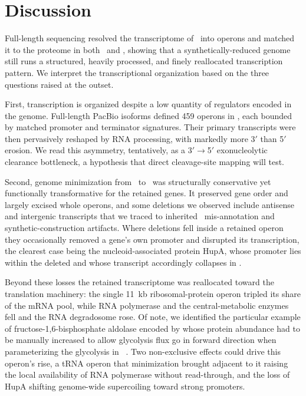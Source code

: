 \newpage

\section{Discussion}

Full-length sequencing resolved the transcriptome of \syn~into operons and matched it to the proteome in both \syn~and \syna, showing that a synthetically-reduced genome still runs a structured, heavily processed, and finely reallocated transcription pattern.
We interpret the transcriptional organization based on the three questions raised at the outset.

First, transcription is organized despite a low quantity of regulators encoded in the genome.
Full-length PacBio isoforms defined 459 operons in \syn, each bounded by matched promoter and terminator signatures. 
Their primary transcripts were then pervasively reshaped by RNA processing, with markedly more 3$'$ than 5$'$ erosion.
We read this asymmetry, tentatively, as a 3$'\rightarrow$5$'$ exonucleolytic clearance bottleneck, a hypothesis that direct cleavage-site mapping will test.

Second, genome minimization from \syn~to \syna~was structurally conservative yet functionally transformative for the retained genes.
It preserved gene order and largely excised whole operons, and some deletions we observed include antisense and intergenic transcripts that we traced to inherited \mmy~mis-annotation and synthetic-construction artifacts.
Where deletions fell inside a retained operon they occasionally removed a gene's own promoter and disrupted its transcription, the clearest case being the nucleoid-associated protein HupA, whose promoter lies within the deleted  and whose transcript accordingly collapses in \syna.

Beyond these losses the retained transcriptome was reallocated toward the translation machinery: the single 11~kb ribosomal-protein operon tripled its share of the mRNA pool, while RNA polymerase and the central-metabolic enzymes fell and the RNA degradosome rose.
Of note, we identified the particular example of fructose-1,6-bisphosphate aldolase encoded by  whose protein abundance had to be manually increased to allow glycolysis flux go in forward direction when parameterizing the glycolysis in \syna~\cite{thornburg_fundamental_2022}.
Two non-exclusive effects could drive this operon's rise, a tRNA operon that minimization brought adjacent to it raising the local availability of RNA polymerase without read-through, and the loss of HupA shifting genome-wide supercoiling toward strong promoters.

